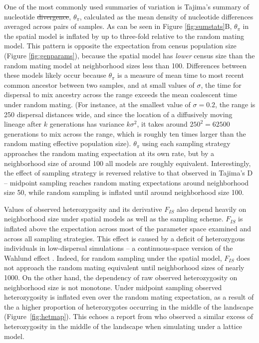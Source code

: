 \documentclass[10pt,twoside,lineno,hidelinks]{preprint} %
\providecommand{\DIFadd}[1]{{\protect\color{blue}\uwave{#1}}} %
\providecommand{\DIFdel}[1]{{\protect\color{red}\sout{#1}}}                      %
\providecommand{\DIFaddbegin}{} %
\providecommand{\DIFaddend}{} %
\providecommand{\DIFdelbegin}{} %
\providecommand{\DIFdelend}{} %
\begin{document}
One of the most commonly used summaries of variation is Tajima's summary of nucleotide \DIFdelbegin \DIFdel{divergence}\DIFdelend \DIFaddbegin \DIFadd{diversity}\DIFaddend , $\theta_{\pi}$, calculated as the mean density of nucleotide differences averaged across pairs of samples. As can be seen in Figure \ref{fig:sumstats}B, $\theta_{\pi}$ in the spatial model is inflated by up to three-fold relative to the random mating model. This pattern is opposite the expectation from census population size (Figure \ref{fig:genparams}), because the spatial model has \emph{lower} census size than the random mating model at neighborhood sizes less than 100. Differences between these models likely occur because $\theta_{\pi}$ is a measure of mean time to most recent common ancestor between two samples, and at small values of $\sigma$, the time for dispersal to mix ancestry across the range exceeds the mean coalescent time under random mating. (For instance, at the smallest value of $\sigma=0.2$, the range is 250 dispersal distances wide, and since the location of a diffusively moving lineage after $k$ generations has variance $k \sigma^2$, it takes around $250^2 = 62500$ generations to mix across the range, which is roughly ten times larger than the random mating effective population size). $\theta_{\pi}$ using each sampling strategy approaches the random mating expectation at its own rate, but by a neighborhood size of around 100 all models are roughly equivalent. Interestingly, the effect of sampling strategy is reversed relative to that observed in Tajima's D -- midpoint sampling reaches random mating expectations around neighborhood size 50, while random sampling is inflated until around neighborhood size 100. 

Values of observed heterozygosity and its derivative $F_{IS}$ also depend heavily on neighborhood size under spatial models as well as the sampling scheme. $F_{IS}$ is inflated above the expectation across most of the parameter space examined and across all sampling strategies. This effect is caused by a deficit of heterozygous individuals in low-dispersal simulations -- a continuous-space version of the Wahlund effect \citep{Wahlund1928}. Indeed, for random sampling under the spatial model, $F_{IS}$ does not approach the random mating equivalent until neighborhood sizes of nearly 1000. On the other hand, the dependency of raw observed heterozygosity on neighborhood size is not monotone. Under midpoint sampling observed heterozygosity is inflated even over the random mating expectation, as a result of the a higher proportion of heterozygotes occurring in the middle of the landscape (Figure~\ref{fig:hetmap}). This echoes a report from \citet{Shirk2014} who observed a similar excess of heterozygosity in the middle of the landscape when simulating under a lattice model.
\end{document}
